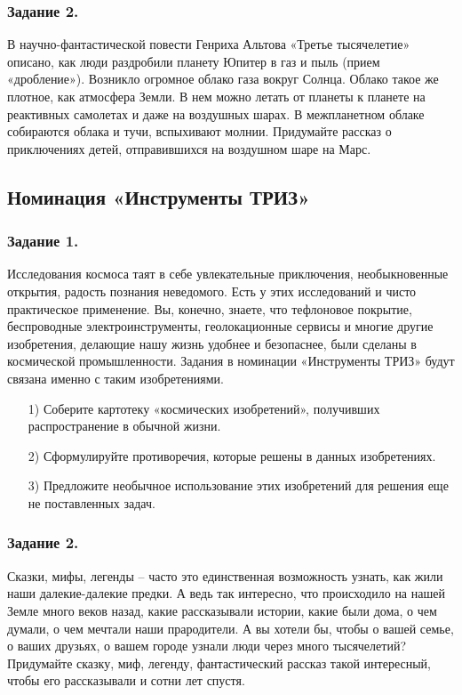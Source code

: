 \documentclass[11pt,a4paper]{article}
\begin{document}
\subsubsection*{Задание 2.}
В научно-фантастической повести Генриха Альтова «Третье тысячелетие» описано,
как люди раздробили планету Юпитер в газ и пыль (прием «дробление»). Возникло
огромное облако газа вокруг Солнца. Облако такое же плотное, как атмосфера
Земли. В нем можно летать от планеты к планете на реактивных самолетах и даже
на воздушных шарах. В межпланетном облаке собираются облака и тучи, вспыхивают
молнии. Придумайте рассказ о приключениях детей, отправившихся на воздушном
шаре на Марс.

\subsection{Номинация «Инструменты ТРИЗ»}

\subsubsection*{Задание 1.}
Исследования космоса таят в себе увлекательные приключения, необыкновенные открытия, радость познания неведомого. Есть у этих исследований и чисто практическое применение. Вы, конечно, знаете, что тефлоновое покрытие, беспроводные электроинструменты, геолокационные сервисы и многие другие изобретения, делающие нашу жизнь удобнее и безопаснее, были сделаны в космической промышленности. Задания в номинации «Инструменты ТРИЗ» будут связана именно с таким изобретениями.
\begin{itemize}[noitemsep]
\item[1)] Соберите картотеку «космических изобретений», получивших
  распространение в обычной жизни.
\item[2)] Сформулируйте противоречия, которые решены в данных изобретениях.
\item[3)] Предложите необычное использование этих изобретений для решения еще
  не поставленных задач.
\end{itemize}

\subsubsection*{Задание 2.}

Сказки, мифы, легенды – часто это единственная возможность узнать, как жили
наши далекие-далекие предки. А ведь так интересно, что происходило на нашей
Земле много веков назад, какие рассказывали истории, какие были дома, о чем
думали, о чем мечтали наши прародители. А вы хотели бы, чтобы о вашей семье, о
ваших друзьях, о вашем городе узнали люди через много тысячелетий?  Придумайте
сказку, миф, легенду, фантастический рассказ такой интересный, чтобы его
рассказывали и сотни лет спустя.
\end{document}
